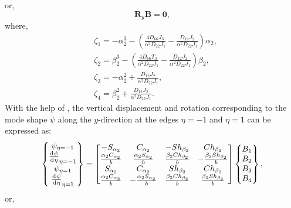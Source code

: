 \documentclass[preprint,12pt]{elsarticle}
\newcommand{\id}{\mathrm{d}\mkern1mu}
\begin{document}
%
or,
%
\begin{equation}\label{eq:ABy1}
	\mathbf{R}_y \mathbf{B} = \mathbf{0},
\end{equation}
%
where,
%
\begin{equation}\label{eq:gammay}
	\begin{split}
		&\zeta_1=-\alpha_2^3-\left( \frac{4D_{66}J_3}{\alpha^2D_{22}J_1}  - \frac{D_{12}J_2}{\alpha^2D_{22}J_1}  \right)\alpha_2,\\
		&\zeta_2=\beta_2^3-\left( \frac{4D_{66}T_3}{\alpha^2D_{22}J_1}  - \frac{D_{12}J_2}{\alpha^2D_{22}J_1}  \right)\beta_2,\\
		&\zeta_3=-\alpha_2^2+\frac{D_{12}J_2}{\alpha^2D_{22}J_1},\\
		&\zeta_4=\beta_2^2+\frac{D_{12}J_2}{\alpha^2D_{22}J_1}.
	\end{split}
\end{equation}
%
With the help of , the vertical displacement and rotation corresponding to the mode shape $\psi$ along the $y$-direction at the edges $\eta = -1$ and $\eta = 1$ can be expressed as:
%
\begin{equation}\label{eq:UBy}
	\begin{split}
		\begin{Bmatrix}
			\psi_{\eta=-1}\\\frac{\id \psi}{\id \eta}_{\eta=-1}\\\psi_{\eta=1}\\\frac{\id \psi}{\id \eta}_{\eta=1}
		\end{Bmatrix}
		= \begin{bmatrix}
			-S_{\alpha_2} & C_{\alpha_2} & -Sh_{\beta_2} & Ch_{\beta_2} \\
			\frac{\alpha_2 C_{\alpha_2}}{b} & \frac{\alpha_2 S_{\alpha_2}}{b} & \frac{\beta_2 Ch_{\beta_2}}{b} & -\frac{\beta_2 Sh_{\beta_2}}{b} \\
			S_{\alpha_2} & C_{\alpha_2} & Sh_{\beta_2} & Ch_{\beta_2} \\
			\frac{\alpha_2 C_{\alpha_2}}{b} & -\frac{\alpha_2 S_{\alpha_2}}{b} & \frac{\beta_2 Ch_{\beta_2}}{b} & \frac{\beta_2 Sh_{\beta_2}}{b}
		\end{bmatrix}
		\begin{Bmatrix}
			B_1\\B_2\\B_3\\B_4
		\end{Bmatrix},		
	\end{split}
\end{equation}
%
or,
\end{document}

